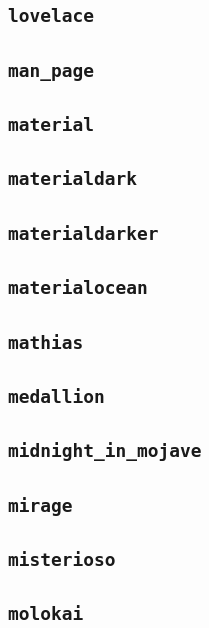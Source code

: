 \subsection{\texttt{lovelace}}
\newpage
\subsection{\texttt{man\_page}}
\newpage
\subsection{\texttt{material}}
\newpage
\subsection{\texttt{materialdark}}
\newpage
\subsection{\texttt{materialdarker}}
\newpage
\subsection{\texttt{materialocean}}
\newpage
\subsection{\texttt{mathias}}
\newpage
\subsection{\texttt{medallion}}
\newpage
\subsection{\texttt{midnight\_in\_mojave}}
\newpage
\subsection{\texttt{mirage}}
\newpage
\subsection{\texttt{misterioso}}
\newpage
\subsection{\texttt{molokai}}
\newpage
